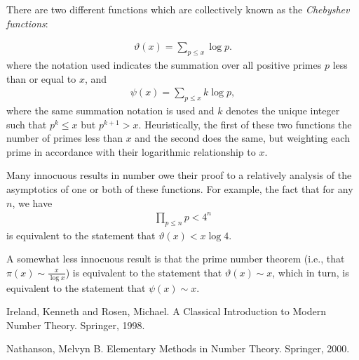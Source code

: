 \documentclass[12pt]{article}
\begin{document}
There are two different functions which are collectively known as the \emph{Chebyshev functions}:

\begin{align*}
\vartheta(x)=\sum_{p\leq x}\log p.
\end{align*}
where the notation used indicates the summation over all positive primes $p$ less than or equal to $x$, and
\begin{align*}
\psi(x)=\sum_{p\leq x}k\log p,
\end{align*}
where the same summation notation is used and $k$ denotes the unique integer such that $p^k\leq x$ but $p^{k+1}>x$.  Heuristically, the first of these two functions  the number of primes less than $x$ and the second does the same, but weighting each prime in accordance with their logarithmic relationship to $x$.

Many innocuous results in number  owe their proof to a relatively  analysis of the asymptotics of one or both of these functions.  For example, the fact that for any $n$, we have
\begin{align*}
\prod_{p\leq n}p<4^n
\end{align*}
is equivalent to the statement that $\vartheta(x)<x\log 4$.

A somewhat less innocuous result is that the prime number theorem (i.e., that $\pi(x)\sim \frac{x}{\log x}$) is equivalent to the statement that $\vartheta(x)\sim x$, which in turn, is equivalent to the statement that $\psi(x)\sim x$.

\begin{thebibliography}{9}
 Ireland, Kenneth and Rosen, Michael.  A Classical Introduction to Modern Number Theory.  Springer, 1998.

 Nathanson, Melvyn B.  Elementary Methods in Number Theory.  Springer, 2000.
\end{thebibliography}
\end{document}
